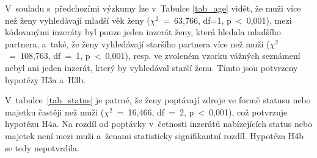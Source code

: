 \documentclass[a4paper, 12pt, notitlepage, oneside, numbers=noenddot]{report}
\begin{document}

V~souladu s~předchozími výzkumy \citep{WayfordDunbar1995} lze
v~Tabulce \ref{tab_age} vidět, že muži více než ženy vyhledávají
mladší věk ženy ($\chi^2 $~=~63,766, df=1, p~{\textless}~0,001), mezi
kódovanými inzeráty byl pouze jeden inzerát ženy, která hledala
mladšího partnera, a~také, že ženy vyhledávají staršího partnera více
než muži ($\chi^2 $~=~108,763, df~=~1, p~{\textless}~0,001), resp. ve
zvoleném vzorku vážných seznámení nebyl ani jeden inzerát, který by
vyhledával starší ženu. Tímto jsou potvrzeny hypotézy H3a a~H3b.


V~tabulce~\ref{tab_status} je patrné, že ženy poptávají zdroje ve
formě statusu nebo majetku častěji než muži ($\chi^2$~=~16,466, df~=~2,
p~{\textless}~0,001), což potvrzuje hypotézu H4a.  Na rozdíl od
poptávky v~četnosti inzerátů nabízejících status nebo majetek není
mezi muži a~ženami statisticky signifikantní rozdíl. Hypotéza H4b se
tedy nepotvrdila.
\end{document}
